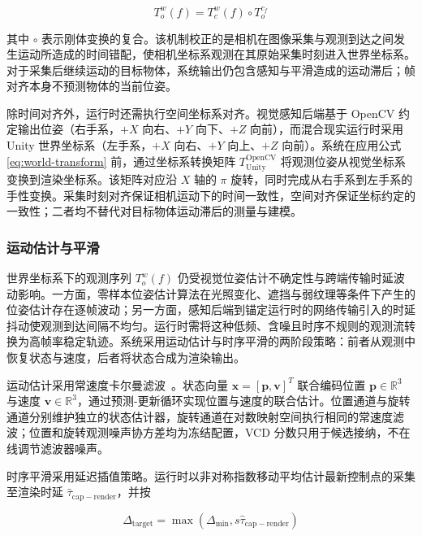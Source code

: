 \documentclass[review]{vgtc}
\begin{document}
\begin{equation}
T_o^w (f) = T_c^w (f) \circ T_o^{c_f}
\label{eq:world-transform}
\end{equation}


其中 $\circ$ 表示刚体变换的复合。该机制校正的是相机在图像采集与观测到达之间发生运动所造成的时间错配，使相机坐标系观测在其原始采集时刻进入世界坐标系。对于采集后继续运动的目标物体，系统输出仍包含感知与平滑造成的运动滞后；帧对齐本身不预测物体的当前位姿。

除时间对齐外，运行时还需执行空间坐标系对齐。视觉感知后端基于 OpenCV 约定输出位姿（右手系，$+X$ 向右、$+Y$ 向下、$+Z$ 向前），而混合现实运行时采用 Unity 世界坐标系（左手系，$+X$ 向右、$+Y$ 向上、$+Z$ 向前）。系统在应用公式 \ref{eq:world-transform} 前，通过坐标系转换矩阵 $T_{\mathrm{Unity}}^{\mathrm{OpenCV}}$ 将观测位姿从视觉坐标系变换到渲染坐标系。该矩阵对应沿 $X$ 轴的 $\pi$ 旋转，同时完成从右手系到左手系的手性变换。采集时刻对齐保证相机运动下的时间一致性，空间对齐保证坐标约定的一致性；二者均不替代对目标物体运动滞后的测量与建模。

\subsubsection{运动估计与平滑}\label{sec:smoothing}


世界坐标系下的观测序列 ${T_o^w (f)}$ 仍受视觉位姿估计不确定性与跨端传输时延波动影响。一方面，零样本位姿估计算法在光照变化、遮挡与弱纹理等条件下产生的位姿估计存在逐帧波动；另一方面，感知后端到锚定运行时的网络传输引入的时延抖动使观测到达间隔不均匀。运行时需将这种低频、含噪且时序不规则的观测流转换为高帧率稳定轨迹。系统采用运动估计与时序平滑的两阶段策略：前者从观测中恢复状态与速度，后者将状态合成为渲染输出。

运动估计采用常速度卡尔曼滤波~\cite{kalman1960new}。状态向量 $\mathbf{x} = [\mathbf{p}, \mathbf{v}]^T$ 联合编码位置 $\mathbf{p} \in \mathbb{R}^3$ 与速度 $\mathbf{v} \in \mathbb{R}^3$，通过预测-更新循环实现位置与速度的联合估计。位置通道与旋转通道分别维护独立的状态估计器，旋转通道在对数映射空间执行相同的常速度滤波；位置和旋转观测噪声协方差均为冻结配置，VCD 分数只用于候选接纳，不在线调节滤波器噪声。

时序平滑采用延迟插值策略。运行时以非对称指数移动平均估计最新控制点的采集至渲染时延 $\widehat{\tau}_{\mathrm{cap-render}}$，并按

\begin{equation}
\Delta_{\mathrm{target}} = \max\!\left(\Delta_{\mathrm{min}}, s \widehat{\tau}_{\mathrm{cap-render}}\right)
\label{eq:adaptive-delay}
\end{equation}
\end{document}
